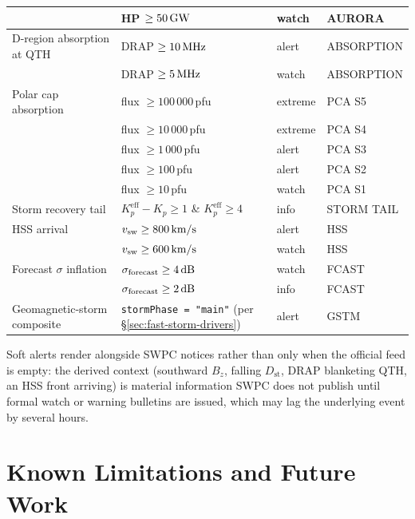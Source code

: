 \documentclass[11pt,a4paper]{article}
\newcommand{\SI}[2]{#1\,\text{#2}}
\newcommand{\dB}{\text{dB}}
\newcommand{\MHz}{\text{MHz}}
\newcommand{\km}{\text{km}}
\newcommand{\GW}{\text{GW}}
\begin{document}
\begin{table}[H]
\begin{tabular}{@{}l l l l@{}}
                             & HP $\ge \SI{50}{\GW}$      & watch   & AURORA \\
\midrule
D-region absorption at QTH   & DRAP $\ge \SI{10}{\MHz}$   & alert   & ABSORPTION \\
                             & DRAP $\ge \SI{5}{\MHz}$    & watch   & ABSORPTION \\
\midrule
Polar cap absorption         & flux $\ge 100\,000$\,pfu   & extreme & PCA S5 \\
                             & flux $\ge 10\,000$\,pfu    & extreme & PCA S4 \\
                             & flux $\ge 1\,000$\,pfu     & alert   & PCA S3 \\
                             & flux $\ge 100$\,pfu        & alert   & PCA S2 \\
                             & flux $\ge 10$\,pfu         & watch   & PCA S1 \\
\midrule
Storm recovery tail          & $K_p^{\text{eff}} - K_p \ge 1$ \& $K_p^{\text{eff}} \ge 4$ & info & STORM TAIL \\
\midrule
HSS arrival                  & $v_{\text{sw}} \ge \SI{800}{\km/s}$       & alert & HSS \\
                             & $v_{\text{sw}} \ge \SI{600}{\km/s}$       & watch & HSS \\
\midrule
Forecast $\sigma$ inflation  & $\sigma_{\text{forecast}} \ge \SI{4}{\dB}$ & watch & FCAST \\
                             & $\sigma_{\text{forecast}} \ge \SI{2}{\dB}$ & info  & FCAST \\
\midrule
Geomagnetic-storm composite  & \texttt{stormPhase = "main"} (per \S\ref{sec:fast-storm-drivers}) & alert & GSTM \\
\bottomrule
\end{tabular}
\end{table}

Soft alerts render alongside SWPC notices rather than only when
the official feed is empty: the derived context (southward
$B_z$, falling $D_{\text{st}}$, DRAP blanketing QTH, an HSS
front arriving) is material information SWPC does not
publish until formal watch or warning bulletins are issued,
which may lag the underlying event by several hours.

\section{Known Limitations and Future Work}\label{sec:limits}
\end{document}
